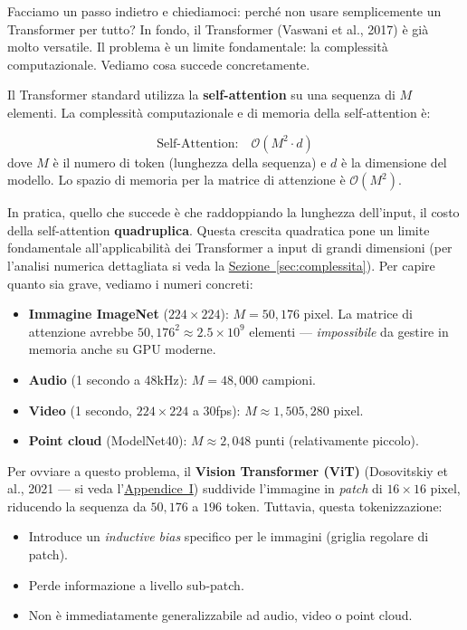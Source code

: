 \documentclass[12pt,a4paper]{article}
\begin{document}
Facciamo un passo indietro e chiediamoci: perch\'e non usare semplicemente un Transformer per tutto? In fondo, il Transformer (Vaswani et al., 2017) \`e gi\`a molto versatile. Il problema \`e un limite fondamentale: la complessit\`a computazionale. Vediamo cosa succede concretamente.

Il Transformer standard utilizza la \textbf{self-attention} su una sequenza di $M$ elementi. La complessit\`a computazionale e di memoria della self-attention \`e:

\begin{formulabox}
\[
    \text{Self-Attention:} \quad \mathcal{O}(M^2 \cdot d)
\]
dove $M$ \`e il numero di token (lunghezza della sequenza) e $d$ \`e la dimensione del modello. Lo spazio di memoria per la matrice di attenzione \`e $\mathcal{O}(M^2)$.
\end{formulabox}

In pratica, quello che succede \`e che raddoppiando la lunghezza dell'input, il costo della self-attention \textbf{quadruplica}. Questa crescita quadratica pone un limite fondamentale all'applicabilit\`a dei Transformer a input di grandi dimensioni (per l'analisi numerica dettagliata si veda la \hyperref[sec:complessita]{Sezione~\ref*{sec:complessita}}). Per capire quanto sia grave, vediamo i numeri concreti:

\begin{examplebox}
\begin{itemize}
    \item \textbf{Immagine ImageNet} ($224 \times 224$): $M = 50{,}176$ pixel. La matrice di attenzione avrebbe $50{,}176^2 \approx 2.5 \times 10^9$ elementi --- \emph{impossibile} da gestire in memoria anche su GPU moderne.
    \item \textbf{Audio} (1 secondo a 48kHz): $M = 48{,}000$ campioni.
    \item \textbf{Video} (1 secondo, $224 \times 224$ a 30fps): $M \approx 1{,}505{,}280$ pixel.
    \item \textbf{Point cloud} (ModelNet40): $M \approx 2{,}048$ punti (relativamente piccolo).
\end{itemize}
\end{examplebox}

Per ovviare a questo problema, il \textbf{Vision Transformer (ViT)} (Dosovitskiy et al., 2021 --- si veda l'\hyperref[app:vit]{Appendice~I}) suddivide l'immagine in \emph{patch} di $16 \times 16$ pixel, riducendo la sequenza da $50{,}176$ a $196$ token. Tuttavia, questa tokenizzazione:
\begin{itemize}
    \item Introduce un \emph{inductive bias} specifico per le immagini (griglia regolare di patch).
    \item Perde informazione a livello sub-patch.
    \item Non \`e immediatamente generalizzabile ad audio, video o point cloud.
\end{itemize}
\end{document}
